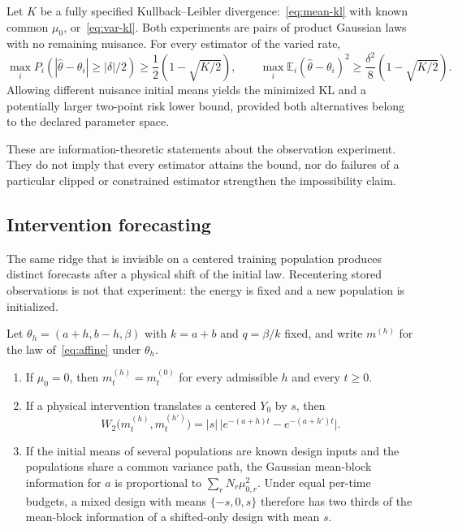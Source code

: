 \documentclass[anon,11pt]{alt2027}
\begin{document}
\begin{corollary}
\label{cor:lecam}
Let $K$ be a fully specified Kullback--Leibler divergence:~\eqref{eq:mean-kl}
with known common $\mu_0$, or~\eqref{eq:var-kl}. Both experiments are pairs of
product Gaussian laws with no remaining nuisance. For every estimator of the
varied rate,
\[
\max_iP_i\!\left(|\widehat\theta-\theta_i|\ge|\delta|/2\right)
\ge\frac12\left(1-\sqrt{K/2}\right),
\qquad
\max_i\mathbb E_i(\widehat\theta-\theta_i)^2
\ge\frac{\delta^2}{8}\left(1-\sqrt{K/2}\right).
\]
Allowing different nuisance initial means yields the minimized KL and a
potentially larger two-point risk lower bound, provided both alternatives
belong to the declared parameter space.
\end{corollary}

These are information-theoretic statements about the observation experiment.
They do not imply that every estimator attains the bound, nor do failures of a
particular clipped or constrained estimator strengthen the impossibility
claim.

\subsection{Intervention forecasting}

The same ridge that is invisible on a centered training population produces
distinct forecasts after a physical shift of the initial law. Recentering
stored observations is not that experiment: the energy is fixed and a new
population is initialized.

\begin{proposition}
\label{prop:intervention}
Let $\theta_h=(a+h,b-h,\beta)$ with $k=a+b$ and $q=\beta/k$ fixed, and write
$m^{(h)}$ for the law of~\eqref{eq:affine} under $\theta_h$.
\begin{enumerate}
\item[(i)] If $\mu_0=0$, then $m^{(h)}_t=m^{(0)}_t$ for every admissible $h$
and every $t\ge 0$.
\item[(ii)] If a physical intervention translates a centered $Y_0$ by $s$, then
\[
W_2\bigl(m^{(h)}_t,m^{(h')}_t\bigr)
=
|s|\,\bigl|e^{-(a+h)t}-e^{-(a+h')t}\bigr|.
\]
\item[(iii)] If the initial means of several populations are known design
inputs and the populations share a common variance path, the Gaussian
mean-block information for $a$ is proportional to $\sum_r N_r\mu_{0,r}^2$.
Under equal per-time budgets, a mixed design with means $\{-s,0,s\}$ therefore
has two thirds of the mean-block information of a shifted-only design with
mean $s$.
\end{enumerate}
\end{proposition}
\end{document}
